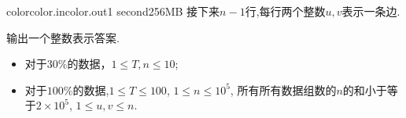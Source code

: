 \documentclass[11pt,a4paper,oneside]{article}
\begin{document}
\begin{problem}{color}{color.in}{color.out}{1 second}{256MB}
	接下来$n-1$行,每行两个整数$u, v$表示一条边.

    \OutputFile

	输出一个整数表示答案.

    \Example

    \begin{example}
    \end{example}


	
    \Note
    
    \begin{itemize}
		\item 对于$30\%$的数据，$1 \leq T, n \leq 10$;
		\item 对于$100\%$的数据,$1 \leq T \leq 100$, $1 \leq n \leq 10^5$, 所有所有数据组数的$n$的和小于等于$2\times 10^5$, $1 \leq u, v \leq n$.
    \end{itemize}

\end{problem}
\end{document}
